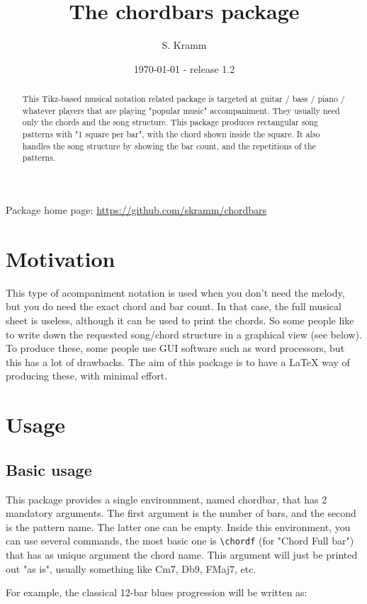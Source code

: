 \documentclass[11pt]{article}
\title{The chordbars package}
\author{S. Kramm}
\date{\today {} - release 1.2}
\begin{document}
\maketitle

\begin{abstract}
This Tikz-based musical notation related package is targeted at guitar / bass / piano / whatever players that are playing "popular music" accompaniment.
They usually need only the chords and the song structure.
This package produces rectangular song patterns with "1 square per bar", with the chord shown inside the square.
It also handles the song structure by showing the bar count, and the repetitions of the patterns.
\end{abstract}

Package home page: \url{https://github.com/skramm/chordbars}

\section{Motivation}

This type of acompaniment notation is used when you don't need the melody, but you do need the exact chord and bar count.
In that case, the full musical sheet is useless, although it can be used to print the chords.
So some people like to write down the requested song/chord structure in a graphical view (see below).
To produce these, some people use GUI software such as word processors, but this has a lot of drawbacks.
The aim of this package is to have a \LaTeX{} way of producing these, with minimal effort.


\section{Usage}
\subsection{Basic usage}
This package provides a single environnment, named {\ttfamily chordbar}, that has 2 mandatory arguments.
The first argument is the number of bars, and the second is the pattern name.
The latter one can be empty.
Inside this environment, you can use several commands, the most basic one is 
\verb|\chordf| (for "Chord Full bar") that has as unique argument the chord name.
This argument will just be printed out "as is", usually something like Cm7, Db9, FMaj7, etc.

For example, the classical 12-bar blues progression will be written as:
\end{document}

